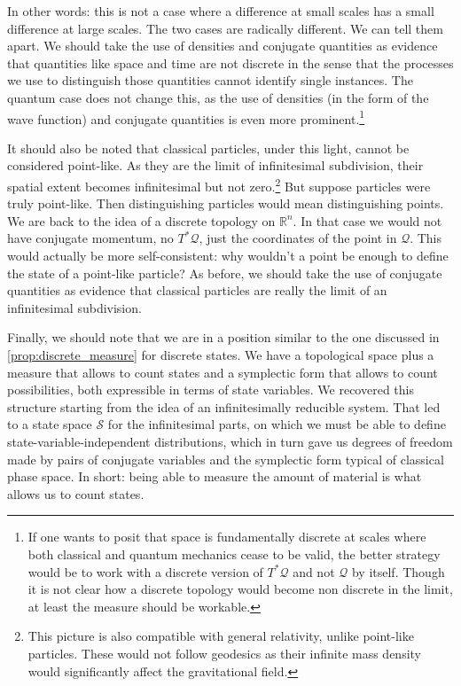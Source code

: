 \documentclass[smallextended]{svjour3}
\numberwithin{equation}{section}
\begin{document}
In other words: this is not a case where a difference at  small scales has a small difference at large scales. The two cases are radically different. We can tell them apart. We should take the use of densities and conjugate quantities as evidence that quantities like space and time are not discrete in the sense that the processes we use to distinguish those quantities cannot identify single instances. The quantum case does not change this, as the use of densities (in the form of the wave function) and conjugate quantities is even more prominent.\footnote{If one wants to posit that space is fundamentally discrete at scales where both classical and quantum mechanics cease to be valid, the better strategy would be to work with a discrete version of $T^*\mathcal{Q}$ and not $\mathcal{Q}$ by itself. Though it is not clear how a discrete topology would become non discrete in the limit, at least the measure should be workable.}

It should also be noted that classical particles, under this light, cannot be considered point-like. As they are the limit of infinitesimal subdivision, their spatial extent becomes infinitesimal but not zero.\footnote{This picture is also compatible with general relativity, unlike point-like particles. These would not follow geodesics as their infinite mass density would significantly affect the gravitational field.} But suppose particles were truly point-like. Then distinguishing particles would mean distinguishing points. We are back to the idea of a discrete topology on $\mathbb{R}^n$. In that case we would not have conjugate momentum, no $T^*\mathcal{Q}$, just the coordinates of the point in $\mathcal{Q}$. This would actually be more self-consistent: why wouldn't a point be enough to define the state of a point-like particle? As before, we should take the use of conjugate quantities as evidence that classical particles are really the limit of an infinitesimal subdivision.

Finally, we should note that we are in a position similar to the one discussed in \ref{prop:discrete_measure} for discrete states. We have a topological space plus a measure that allows to count states and a symplectic form that allows to count possibilities, both expressible in terms of state variables. We recovered this structure starting from the idea of an infinitesimally reducible system. That led to a state space $\mathcal{S}$ for the infinitesimal parts, on which we must be able to define state-variable-independent distributions, which in turn gave us degrees of freedom made by pairs of conjugate variables and the symplectic form typical of classical phase space. In short: being able to measure the amount of material is what allows us to count states.
\end{document}

